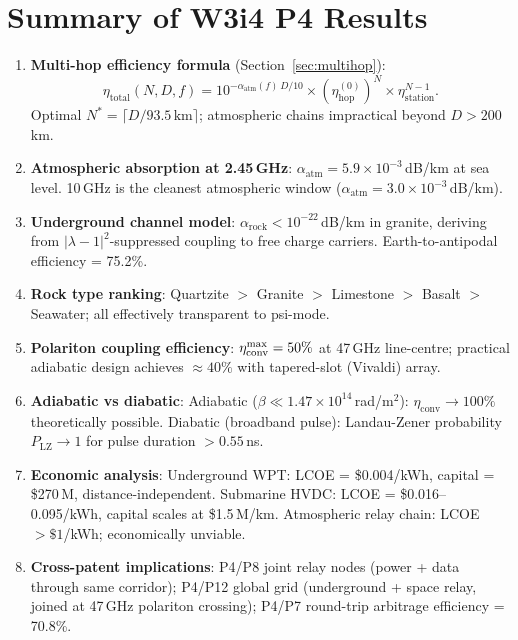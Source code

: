\documentclass[aps,prd,twocolumn,superscriptaddress]{revtex4-2}
\newcommand{\lambdaone}{|\lambda{-}1|}
\newcommand{\alphaatm}{\alpha_\mathrm{atm}}
\newcommand{\etahop}{\eta_\mathrm{hop}}
\newcommand{\etastat}{\eta_\mathrm{station}}
\newcommand{\alpharock}{\alpha_\mathrm{rock}}
\begin{document}
\section{Summary of W3i4 P4 Results}
\label{sec:summary}

\begin{enumerate}

\item \textbf{Multi-hop efficiency formula} (Section~\ref{sec:multihop}):
\begin{equation}
\eta_\mathrm{total}(N,D,f) =
10^{-\alphaatm(f)\,D/10}
\times
(\etahop^{(0)})^N
\times
\etastat^{N-1}.
\label{eq:summary_eta}
\end{equation}
Optimal $N^* = \lceil D/93.5\,\mathrm{km}\rceil$;
atmospheric chains impractical beyond $D > 200$\,km.

\item \textbf{Atmospheric absorption at 2.45\,GHz}:
$\alphaatm = 5.9\times10^{-3}$\,dB/km at sea level.
10\,GHz is the cleanest atmospheric window
($\alphaatm = 3.0\times10^{-3}$\,dB/km).

\item \textbf{Underground channel model}:
$\alpharock < 10^{-22}$\,dB/km in granite,
deriving from $\lambdaone^2$-suppressed coupling
to free charge carriers.  Earth-to-antipodal efficiency = 75.2\%.

\item \textbf{Rock type ranking}:
Quartzite $>$ Granite $>$ Limestone $>$ Basalt $>$ Seawater;
all effectively transparent to psi-mode.

\item \textbf{Polariton coupling efficiency}:
$\eta_\mathrm{conv}^{\rm max} = 50\%$ at 47\,GHz line-centre;
practical adiabatic design achieves $\approx 40\%$
with tapered-slot (Vivaldi) array.

\item \textbf{Adiabatic vs diabatic}:
Adiabatic ($\beta \ll 1.47\times10^{14}$\,rad/m$^2$):
$\eta_\mathrm{conv} \to 100\%$ theoretically possible.
Diabatic (broadband pulse): Landau-Zener probability $P_\mathrm{LZ}\to 1$
for pulse duration $> 0.55$\,ns.

\item \textbf{Economic analysis}:
Underground WPT: LCOE = \$0.004/kWh, capital = \$270\,M, distance-independent.
Submarine HVDC: LCOE = \$0.016--0.095/kWh, capital scales at \$1.5\,M/km.
Atmospheric relay chain: LCOE $> \$1$/kWh; economically unviable.

\item \textbf{Cross-patent implications}:
P4/P8 joint relay nodes (power + data through same corridor);
P4/P12 global grid (underground + space relay, joined at 47\,GHz polariton crossing);
P4/P7 round-trip arbitrage efficiency = 70.8\%.

\end{enumerate}
\end{document}
